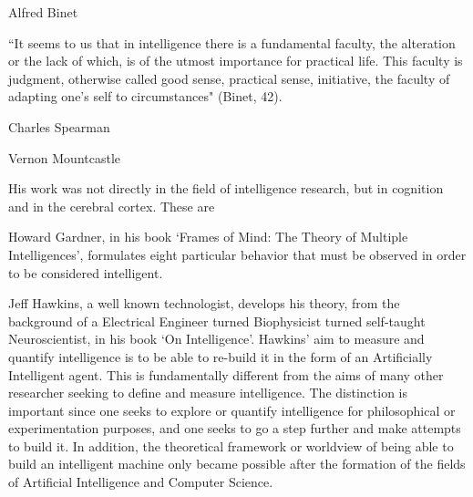 \documentclass[11pt, oneside]{article}
\begin{document}

\par Alfred Binet
\par ``It seems to us that in intelligence there is a fundamental faculty, the alteration or the lack of which, is of the utmost importance for practical life. This faculty is judgment, otherwise called good sense, practical sense, initiative, the faculty of adapting one's self to circumstances" (Binet, 42).


\par Charles Spearman


% 


\par Vernon Mountcastle 
\par His work was not directly in the field of intelligence research, but in cognition and in the cerebral cortex. These are 


\par Howard Gardner, in his book `Frames of Mind: The Theory of Multiple Intelligences', formulates eight particular behavior that must be observed in order to be considered intelligent. 


\par Jeff Hawkins, a well known technologist, develops his theory, from the background of a Electrical Engineer turned Biophysicist turned self-taught Neuroscientist, in his book `On Intelligence'. Hawkins' aim to measure and quantify intelligence is to be able to re-build it in the form of an Artificially Intelligent agent. This is fundamentally different from the aims of many other researcher seeking to define and measure intelligence. The distinction is important since one seeks to explore or quantify intelligence for philosophical or experimentation purposes, and one seeks to go a step further and make attempts to build it. In addition, the theoretical framework or worldview of being able to build an intelligent machine only became possible after the formation of the fields of Artificial Intelligence and Computer Science.
\end{document}
